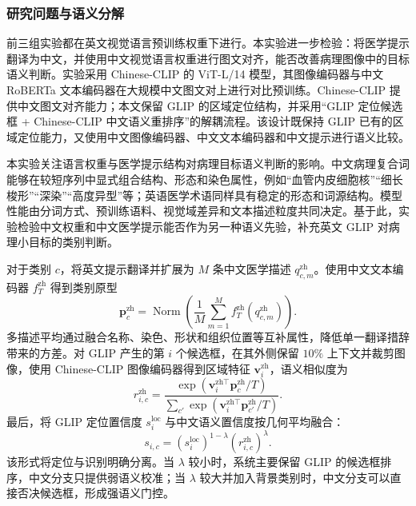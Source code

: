 \subsubsection{研究问题与语义分解}

前三组实验都在英文视觉语言预训练权重下进行。本实验进一步检验：将医学提示翻译为中文，并使用中文视觉语言权重进行图文对齐，能否改善病理图像中的目标语义判断。实验采用 Chinese-CLIP 的 ViT-L/14 模型，其图像编码器与中文 RoBERTa 文本编码器在大规模中文图文对上进行对比预训练\cite{yang2022chineseclip}。Chinese-CLIP 提供中文图文对齐能力；本文保留 GLIP 的区域定位结构，并采用“GLIP 定位候选框 + Chinese-CLIP 中文语义重排序”的解耦流程。该设计既保持 GLIP 已有的区域定位能力，又使用中文图像编码器、中文文本编码器和中文提示进行语义比较。

本实验关注语言权重与医学提示结构对病理目标语义判断的影响。中文病理复合词能够在较短序列中显式组合结构、形态和染色属性，例如“血管内皮细胞核”“细长梭形”“深染”“高度异型”等；英语医学术语同样具有稳定的形态和词源结构。模型性能由分词方式、预训练语料、视觉域差异和文本描述粒度共同决定。基于此，实验检验中文权重和中文医学提示能否作为另一种语义先验，补充英文 GLIP 对病理小目标的类别判断。

对于类别 $c$，将英文提示翻译并扩展为 $M$ 条中文医学描述 $q_{c,m}^{\mathrm{zh}}$。使用中文文本编码器 $f_T^{\mathrm{zh}}$ 得到类别原型
\begin{equation}
\boldsymbol p_c^{\mathrm{zh}}
=\operatorname{Norm}\left(
\frac{1}{M}\sum_{m=1}^{M}
f_T^{\mathrm{zh}}(q_{c,m}^{\mathrm{zh}})
\right).
\end{equation}
多描述平均通过融合名称、染色、形状和组织位置等互补属性，降低单一翻译措辞带来的方差。对 GLIP 产生的第 $i$ 个候选框，在其外侧保留 $10\%$ 上下文并裁剪图像，使用 Chinese-CLIP 图像编码器得到区域特征 $\boldsymbol v_i^{\mathrm{zh}}$，语义相似度为
\begin{equation}
r_{i,c}^{\mathrm{zh}}
=\frac{
\exp(\boldsymbol v_i^{\mathrm{zh}\top}
\boldsymbol p_c^{\mathrm{zh}}/T)}
{\sum_{c'}\exp(
\boldsymbol v_i^{\mathrm{zh}\top}
\boldsymbol p_{c'}^{\mathrm{zh}}/T)}.
\end{equation}
最后，将 GLIP 定位置信度 $s_i^{\mathrm{loc}}$ 与中文语义置信度按几何平均融合：
\begin{equation}
s_{i,c}
=(s_i^{\mathrm{loc}})^{1-\lambda}
(r_{i,c}^{\mathrm{zh}})^{\lambda}.
\end{equation}
该形式将定位与识别明确分离。当 $\lambda$ 较小时，系统主要保留 GLIP 的候选框排序，中文分支只提供弱语义校准；当 $\lambda$ 较大并加入背景类别时，中文分支可以直接否决候选框，形成强语义门控。

